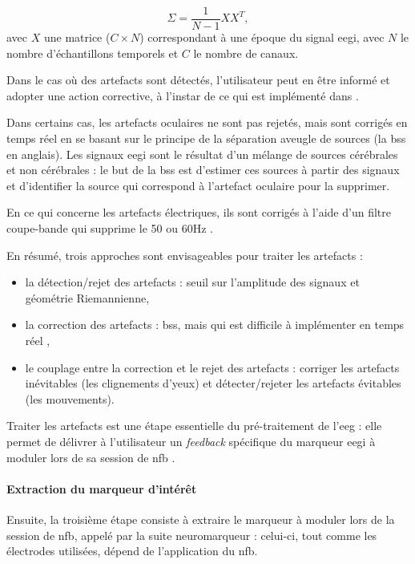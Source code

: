 \begin{equation}
\label{eq:introduction_covariance_matrix}
\Sigma = \frac{1}{N - 1}XX^T,
\end{equation}
avec $X$ une matrice ($C \times N$) correspondant à une époque du signal \gls{eegi}, avec $N$ le nombre d'échantillons temporels et $C$ le nombre de canaux. 

Dans le cas où des artefacts sont détectés, l'utilisateur peut en être informé et adopter une action corrective, à l'instar de ce qui est implémenté dans 
\citet{Bioulac2019}.

Dans certains cas, les artefacts oculaires ne sont pas rejetés, mais sont corrigés en temps réel \citep{Barthelemy2017, Maurizio2014, Bioulac2019} en se basant sur
le principe de la séparation aveugle de sources (la \gls{bss} en anglais). Les signaux \gls{eegi} sont le résultat d'un mélange de sources cérébrales et non cérébrales : le but 
de la \gls{bss} est d'estimer ces sources à partir des signaux et d'identifier la source qui correspond à l'artefact oculaire pour la supprimer.

En ce qui concerne les artefacts électriques, ils sont corrigés à l'aide d'un filtre coupe-bande qui supprime le 50 ou 60Hz \citep{Bioulac2019}.

En résumé, trois approches sont envisageables pour traiter les artefacts :
\begin{itemize}
\item la détection/rejet des artefacts : seuil sur l'amplitude des signaux et géométrie Riemannienne,
\item la correction des artefacts : \gls{bss}, mais qui est difficile à implémenter en temps réel \citep{Barthelemy2017},
\item le couplage entre la correction et le rejet des artefacts : corriger les artefacts inévitables (les clignements d'yeux) 
et détecter/rejeter les artefacts évitables (les mouvements).
\end{itemize}

Traiter les artefacts est une étape essentielle du pré-traitement de l'\gls{eeg} : elle permet de délivrer à l'utilisateur un \textit{feedback} 
spécifique du marqueur \gls{eegi} à moduler lors de sa session de \gls{nfb} \citep{Barthelemy2019}. 

\paragraph{Extraction du marqueur d'intérêt}
Ensuite, la troisième étape consiste à extraire le marqueur à moduler lors de la session de \gls{nfb}, appelé par la suite neuromarqueur : 
celui-ci, tout comme les électrodes utilisées, dépend de l'application du \gls{nfb}. 

